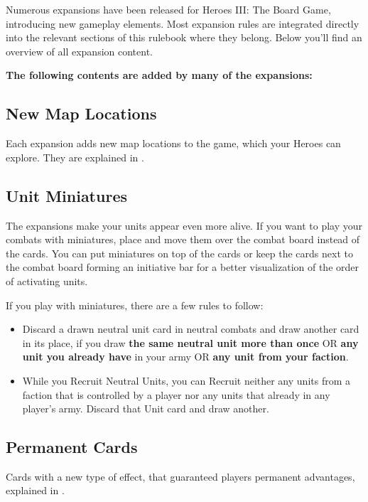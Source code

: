 
Numerous expansions have been released for Heroes III: The Board Game, introducing new gameplay elements.
Most expansion rules are integrated directly into the relevant sections of this rulebook where they belong.
Below you'll find an overview of all expansion content.

\vspace*{1em}

\textbf{The following contents are added by many of the expansions:}
\begin{multicols*}{2}
\subsection*{New Map Locations}
Each expansion adds new map locations to the game, which your Heroes can explore.
They are explained in .

\subsection*{Unit Miniatures}
The expansions make your units appear even more alive. 
If you want to play your combats with miniatures, place and move them over the combat board instead of the cards. 
You can put miniatures on top of the cards or keep the cards next to the combat board forming an initiative bar for a better visualization of the order of activating units.\par
\vspace*{1em}
If you play with miniatures, there are a few rules to follow:
\begin{itemize}
	\item Discard a drawn neutral unit card in neutral combats and draw another card in its place, if you draw \textbf{the same neutral unit more than once} OR \textbf{any unit you already have} in your army OR \textbf{any unit from your faction}. 
	\item While you Recruit Neutral Units, you can Recruit neither any units from a faction that is controlled by a player nor any units that already in any player's army. 
	Discard that Unit card and draw another. 
\end{itemize}

\subsection*{Permanent Cards}
Cards with a new type of effect, that guaranteed players permanent advantages, explained in .


\end{multicols*}
